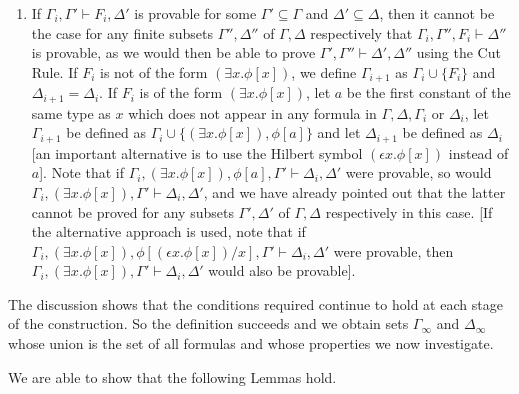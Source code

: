 \documentclass[12pt]{book}
\begin{document}
\begin{description}
\begin{enumerate}
\item If $\Gamma_i,\Gamma'\vdash F_i,\Delta'$ is provable for some
$\Gamma'\subseteq \Gamma$ and $\Delta'\subseteq \Delta$, then it
cannot be the case for any finite subsets $\Gamma'',\Delta''$ of
$\Gamma,\Delta$ respectively that $\Gamma_i,\Gamma'',F_i\vdash
\Delta''$ is provable, as we would then be able to prove
$\Gamma',\Gamma''\vdash\Delta',\Delta''$ using the Cut Rule.  If $F_i$
is not of the form $(\exists x.\phi[x])$, we define $\Gamma_{i+1}$ as
$\Gamma_{i}\cup \{F_i\}$ and $\Delta_{i+1} = \Delta_i$.  If $F_i$ is
of the form $(\exists x.\phi[x])$, let $a$ be the first constant of
the same type as $x$ which does not appear in any formula in
$\Gamma,\Delta, \Gamma_i$ or $\Delta_i$, let $\Gamma_{i+1}$ be defined
as $\Gamma_{i}\cup \{(\exists x.\phi[x]),\phi[a]\}$ and let
$\Delta_{i+1}$ be defined as $\Delta_i$ [an important alternative is
to use the Hilbert symbol $(\epsilon x.\phi[x])$ instead of $a$].
Note that if $\Gamma_{i},(\exists x.\phi[x]),\phi[a],\Gamma' \vdash
\Delta_i,\Delta'$ were provable, so would $\Gamma_{i},(\exists
x.\phi[x]),\Gamma' \vdash \Delta_i,\Delta'$, and we have already
pointed out that the latter cannot be proved for any subsets
$\Gamma',\Delta'$ of $\Gamma,\Delta$ respectively in this case.  [If
the alternative approach is used, note that if $\Gamma_{i},(\exists
x.\phi[x]),\phi[(\epsilon x.\phi[x])/x],\Gamma' \vdash
\Delta_i,\Delta'$ were provable, then $\Gamma_{i},(\exists
x.\phi[x]),\Gamma' \vdash \Delta_i,\Delta'$ would also be provable].
\end{enumerate}

\end{description}

The discussion shows that the conditions required continue to hold at
each stage of the construction.  So the definition succeeds and we
obtain sets $\Gamma_{\infty}$ and $\Delta_{\infty}$ whose union is the
set of all formulas and whose properties we now investigate.

We are able to show that the following Lemmas hold.
\end{document}
